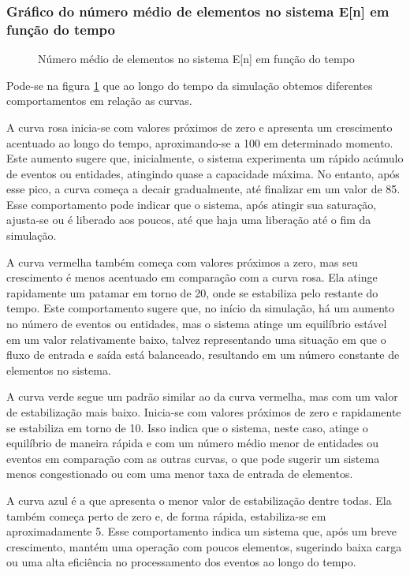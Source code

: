 \subsubsection{Gráfico do número médio de elementos no sistema E[n] em função do tempo}
\begin{figure}[h!]
   \centering
   
   \caption{Número médio de elementos no sistema E[n] em função do tempo}
   \label{fig:eN}
\end{figure}
Pode-se na figura \ref{fig:eN} que ao longo do tempo da simulação obtemos diferentes comportamentos em relação as curvas.

A curva rosa inicia-se com valores próximos de zero e apresenta um crescimento acentuado ao longo do tempo, aproximando-se a 100 em determinado momento. Este aumento sugere que, inicialmente, o sistema experimenta um rápido acúmulo de eventos ou entidades, atingindo quase a capacidade máxima. No entanto, após esse pico, a curva começa a decair gradualmente, até finalizar em um valor de 85. Esse comportamento pode indicar que o sistema, após atingir sua saturação, ajusta-se ou é liberado aos poucos, até que haja uma liberação até o fim da simulação.

A curva vermelha também começa com valores próximos a zero, mas seu crescimento é menos acentuado em comparação com a curva rosa. Ela atinge rapidamente um patamar em torno de 20, onde se estabiliza pelo restante do tempo. Este comportamento sugere que, no início da simulação, há um aumento no número de eventos ou entidades, mas o sistema atinge um equilíbrio estável em um valor relativamente baixo, talvez representando uma situação em que o fluxo de entrada e saída está balanceado, resultando em um número constante de elementos no sistema.

A curva verde segue um padrão similar ao da curva vermelha, mas com um valor de estabilização mais baixo. Inicia-se com valores próximos de zero e rapidamente se estabiliza em torno de 10. Isso indica que o sistema, neste caso, atinge o equilíbrio de maneira rápida e com um número médio menor de entidades ou eventos em comparação com as outras curvas, o que pode sugerir um sistema menos congestionado ou com uma menor taxa de entrada de elementos.

A curva azul é a que apresenta o menor valor de estabilização dentre todas. Ela também começa perto de zero e, de forma rápida, estabiliza-se em aproximadamente 5. Esse comportamento indica um sistema que, após um breve crescimento, mantém uma operação com poucos elementos, sugerindo baixa carga ou uma alta eficiência no processamento dos eventos ao longo do tempo.

